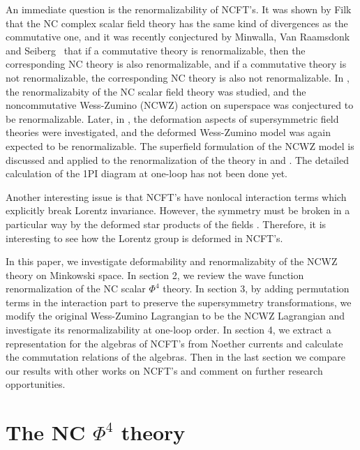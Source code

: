 \documentclass[a4paper,a4paper]{article}
\begin{document}
An immediate question is the renormalizability of NCFT's. 
It was shown by Filk~\cite{Filk} that the NC complex scalar field theory 
has the same kind of divergences as the commutative one, 
and it was recently conjectured by Minwalla, 
Van Raamsdonk and Seiberg~\cite{MRS} that if a commutative theory is renormalizable, 
then the corresponding NC theory is also renormalizable, and if a commutative 
theory is not renormalizable, the corresponding NC theory is also not 
renormalizable. 
In \cite{CR}, the renormalizabity of the NC scalar field theory was studied, 
and the noncommutative Wess-Zumino (NCWZ) action on superspace was conjectured to be 
renormalizable. Later, in \cite{FL}, the deformation aspects of supersymmetric 
field theories were investigated, and the deformed Wess-Zumino model 
was again expected to be 
renormalizable. The superfield formulation of the NCWZ model is discussed and applied to 
the renormalization of the theory 
in \cite{CF} and \cite{AJH}. The detailed calculation of the 1PI diagram at one-loop 
has not been done yet. 

Another interesting issue is that NCFT's have nonlocal
interaction terms which explicitly break Lorentz invariance. However, the symmetry
must be broken in a particular way by the deformed star products of the fields
. Therefore, it is interesting to see how the Lorentz group is deformed in NCFT's.


In this paper, we investigate deformability and renormalizabity of the NCWZ theory 
on Minkowski space. In section 2, we review the wave function 
renormalization of the NC scalar $\Phi^4$ theory. In section 3, 
by adding permutation terms in the interaction part to preserve the 
supersymmetry transformations, we modify the original Wess-Zumino Lagrangian to be the NCWZ 
Lagrangian and investigate its renormalizability at one-loop order.
In section 4, we extract a representation for the algebras of NCFT's from  
Noether currents and calculate the commutation relations of the algebras.  
Then in the last section we compare our results with other works on  
NCFT's and comment on further research opportunities.

\section{The NC $\Phi^4$ theory}
\end{document}
